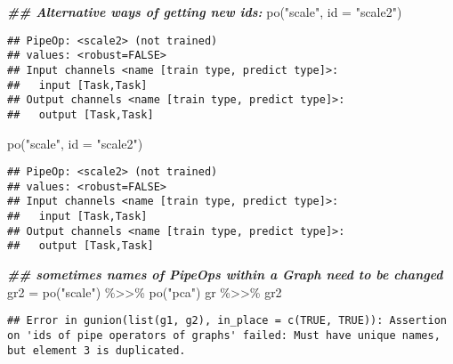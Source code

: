\documentclass[
]{scrbook}
\newenvironment{Shaded}{\begin{snugshade}}{\end{snugshade}}
\newcommand{\AttributeTok}[1]{\textcolor[rgb]{0.77,0.63,0.00}{#1}}
\newcommand{\DocumentationTok}[1]{\textcolor[rgb]{0.56,0.35,0.01}{\textbf{\textit{#1}}}}
\newcommand{\FunctionTok}[1]{\textcolor[rgb]{0.00,0.00,0.00}{#1}}
\newcommand{\NormalTok}[1]{#1}
\newcommand{\OtherTok}[1]{\textcolor[rgb]{0.56,0.35,0.01}{#1}}
\newcommand{\SpecialCharTok}[1]{\textcolor[rgb]{0.00,0.00,0.00}{#1}}
\newcommand{\StringTok}[1]{\textcolor[rgb]{0.31,0.60,0.02}{#1}}
\renewenvironment{Shaded} {\begin{snugshade}\small} {\end{snugshade}}
\begin{document}
\begin{Shaded}
\begin{Highlighting}[]
\DocumentationTok{\#\# Alternative ways of getting new ids:}
\FunctionTok{po}\NormalTok{(}\StringTok{"scale"}\NormalTok{, }\AttributeTok{id =} \StringTok{"scale2"}\NormalTok{)}
\end{Highlighting}
\end{Shaded}

\begin{verbatim}
## PipeOp: <scale2> (not trained)
## values: <robust=FALSE>
## Input channels <name [train type, predict type]>:
##   input [Task,Task]
## Output channels <name [train type, predict type]>:
##   output [Task,Task]
\end{verbatim}

\begin{Shaded}
\begin{Highlighting}[]
\FunctionTok{po}\NormalTok{(}\StringTok{"scale"}\NormalTok{, }\AttributeTok{id =} \StringTok{"scale2"}\NormalTok{)}
\end{Highlighting}
\end{Shaded}

\begin{verbatim}
## PipeOp: <scale2> (not trained)
## values: <robust=FALSE>
## Input channels <name [train type, predict type]>:
##   input [Task,Task]
## Output channels <name [train type, predict type]>:
##   output [Task,Task]
\end{verbatim}

\begin{Shaded}
\begin{Highlighting}[]
\DocumentationTok{\#\# sometimes names of PipeOps within a Graph need to be changed}
\NormalTok{gr2 }\OtherTok{=} \FunctionTok{po}\NormalTok{(}\StringTok{"scale"}\NormalTok{) }\SpecialCharTok{\%\textgreater{}\textgreater{}\%} \FunctionTok{po}\NormalTok{(}\StringTok{"pca"}\NormalTok{)}
\NormalTok{gr }\SpecialCharTok{\%\textgreater{}\textgreater{}\%}\NormalTok{ gr2}
\end{Highlighting}
\end{Shaded}

\begin{verbatim}
## Error in gunion(list(g1, g2), in_place = c(TRUE, TRUE)): Assertion on 'ids of pipe operators of graphs' failed: Must have unique names, but element 3 is duplicated.
\end{verbatim}

\begin{Shaded}
\end{Shaded}
\end{document}
